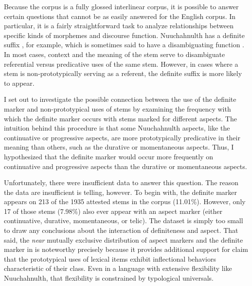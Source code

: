 Because the  corpus is a fully glossed interlinear corpus, it is possible to answer certain questions that cannot be as easily answered for the English corpus. In particular, it is a fairly straightforward task to analyze relationships between specific kinds of morphemes and discourse function. Nuuchahnulth has a definite suffix , for example, which is sometimes said to have a disambiguating function \parencites[60-63]{Mithun1999}[48]{Nakayama2001}. In most cases, context and the meaning of the stem serve to disambiguate referential versus predicative uses of the same stem. However, in cases where a stem is non-prototypically serving as a referent, the definite suffix is more likely to appear.

I set out to investigate the possible connection between the use of the definite marker and non-prototypical uses of stems by examining the frequency with which the definite marker occurs with stems marked for different aspects.  The intuition behind this procedure is that some Nuuchahnulth aspects, like the continuative or progressive aspects, are more prototypically predicative in their meaning than others, such as the durative or momentaneous aspects. Thus, I hypothesized that the definite marker would occur more frequently on continuative and progressive aspects than the durative or momentaneous aspects.

Unfortunately, there were insufficient data to answer this question. The reason the data are insufficient is telling, however. To begin with, the definite marker appears on 213 of the 1935 attested stems in the corpus (11.01\%). However, only 17 of those stems (7.98\%) also ever appear with an aspect marker (either continuative, durative, momentaneous, or telic). The dataset is simply too small to draw any conclusions about the interaction of definiteness and aspect. That said, the \emph{near} mutually exclusive distribution of aspect markers and the definite marker in  is noteworthy precisely because it provides additional support for  claim that the prototypical uses of lexical items exhibit inflectional behaviors characteristic of their class. Even in a language with extensive flexibility like Nuuchahnulth, that flexibility is constrained by typological universals.
